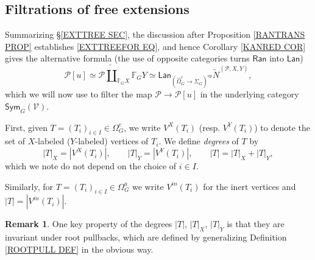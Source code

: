 \documentclass[a4paper,10pt
,draft
]{article}%
\numberwithin{equation}{section}
\numberwithin{figure}{section}
\theoremstyle{definition} %
\newtheorem{remark}[equation]{Remark}%
\newcommand{\Sym}{\ensuremath{\mathsf{Sym}}}%
\newcommand{\V}{\ensuremath{\mathcal V}}
\newcommand{\1}{\ensuremath{\mathbbm 1}}%
\begin{document}
\renewcommand{\labelenumi}{\theenumi}
\renewcommand{\theenumi}{(\roman{enumi})}%

\subsection{Filtrations of free extensions}
\label{FILTRATION_SECTION}

Summarizing \S \ref{EXTTREE SEC},
the discussion after Proposition \ref{RANTRANS PROP}
establishes \eqref{EXTTREEFOR EQ}, and hence 
Corollary \ref{KANRED COR} 
gives the alternative formula
(the use of opposite categories turns 
$\mathsf{Ran}$ into $\mathsf{Lan}$)
\begin{equation}\label{ALTFOR EQ}
	\mathcal{P}[u] \simeq
	\mathcal{P} \mathbin{\check{\coprod}}_{\mathbb{F}_G X} \mathbb{F}_G Y 
\simeq 
	\mathsf{Lan}_{\left( \widehat{\Omega}_{G}^{e} \to \Sigma_G \right)^{op}}
	\tilde{N}^{(\mathcal{P},X,Y)},
\end{equation}
which we will now use to 
filter the map
$\mathcal{P} \to \mathcal{P}[u]$
in the underlying category
$\Sym_G(\V)$.

First, given 
$T = (T_i)_{i \in I} \in \Omega_G^e$,
we write $V^X(T_i)$ (resp. $V^Y(T_i)$)
to denote the set of 
$X$-labeled ($Y$-labeled) vertices of $T_i$.
We define \textit{degrees} of $T$ by
\[
|T|_X = |V^X(T_i)|,
	\qquad
|T|_Y = |V^Y(T_i)|,
	\qquad
|T| = |T|_X + |T|_Y,
\]
which we note do not depend on the choice of $i \in I$.

Similarly, for $T = (T_i)_{i \in I} \in \Omega_G^a$
we write $V^{in}(T_i)$ for the inert vertices and
$|T| = |V^{in}(T_i)|$.

\begin{remark}
	One key property of the degrees $|T|$, $|T|_X$, $|T|_Y$ is that they are invariant under root pullbacks, which are defined
	by generalizing Definition \ref{ROOTPULL DEF}
	in the obvious way.
\end{remark}
\end{document}

